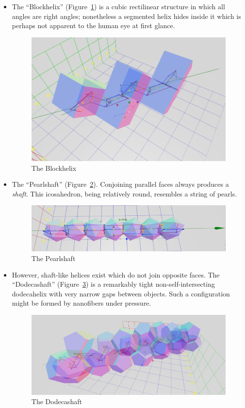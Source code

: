 \documentclass[mathematics,article,submit,pdftex,moreauthors]{Definitions/mdpi}
\begin{document}
\begin{itemize}
\item The ``Blockhelix'' (Figure~\ref{fig:blockhelix}) is a cubic rectilinear structure in which all angles are right angles; nonetheless
  a segmented helix hides inside it which is perhaps not apparent to the human eye at first glance.
\begin{figure}
  \centering
  \captionsetup{justification=centering}
     \includegraphics[width=10 cm]{figures/Blockhelix.png}
     \caption{The Blockhelix}
  \label{fig:blockhelix}
\end{figure}
\unskip


\item The ``Pearlshaft'' (Figure~\ref{fig:pearlshaft}). Conjoining parallel faces always produces a {\em shaft}. This icosahedron, being relatively round,
  resembles a string of pearls.
\begin{figure}
  \centering
  \captionsetup{justification=centering}
     \includegraphics[width=10 cm]{figures/PearlShaft.png}
     \caption{The Pearlshaft}
  \label{fig:pearlshaft}
\end{figure}
\unskip


\item However, shaft-like helices exist which do not join opposite faces. The ``Dodecashaft'' (Figure~\ref{fig:dodecashaft}) is a remarkably tight
  non-self-intersecting dodecahelix with very narrow gaps between objects.
  Such a configuration
  might be formed by nanofibers under pressure.
\begin{figure}
  \centering
  \captionsetup{justification=centering}
     \includegraphics[width=10 cm]{figures/Dodecashaft.png}
     \caption{The Dodecashaft}
  \label{fig:dodecashaft}
\end{figure}
\unskip


\end{itemize}
\end{document}
